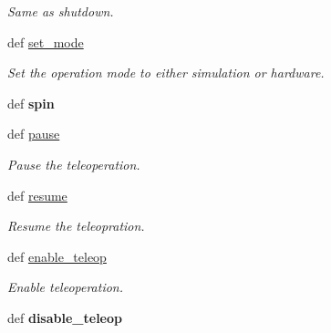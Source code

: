 \begin{DoxyCompactItemize}
\begin{DoxyCompactList}\small\item\em Same as shutdown. \end{DoxyCompactList}\item 
def \hyperlink{classcamera__control__node_1_1Teleop__class_a611b6acc2e845d0269b2194ae1c52457}{set\-\_\-mode}
\begin{DoxyCompactList}\small\item\em Set the operation mode to either simulation or hardware. \end{DoxyCompactList}\item 
\hypertarget{classcamera__control__node_1_1Teleop__class_abbb8d5b8c8dfbc2736fb3e1cb28d54f6}{def {\bfseries spin}}\label{classcamera__control__node_1_1Teleop__class_abbb8d5b8c8dfbc2736fb3e1cb28d54f6}

\item 
\hypertarget{classcamera__control__node_1_1Teleop__class_a4ad0f95701d0951b3f758613f5fdc3c5}{def \hyperlink{classcamera__control__node_1_1Teleop__class_a4ad0f95701d0951b3f758613f5fdc3c5}{pause}}\label{classcamera__control__node_1_1Teleop__class_a4ad0f95701d0951b3f758613f5fdc3c5}

\begin{DoxyCompactList}\small\item\em Pause the teleoperation. \end{DoxyCompactList}\item 
\hypertarget{classcamera__control__node_1_1Teleop__class_a55a643e5dfb067fd86426c9aea1a8ec3}{def \hyperlink{classcamera__control__node_1_1Teleop__class_a55a643e5dfb067fd86426c9aea1a8ec3}{resume}}\label{classcamera__control__node_1_1Teleop__class_a55a643e5dfb067fd86426c9aea1a8ec3}

\begin{DoxyCompactList}\small\item\em Resume the teleopration. \end{DoxyCompactList}\item 
\hypertarget{classcamera__control__node_1_1Teleop__class_a4f6e515dab9822f8513ad23da7be7b36}{def \hyperlink{classcamera__control__node_1_1Teleop__class_a4f6e515dab9822f8513ad23da7be7b36}{enable\-\_\-teleop}}\label{classcamera__control__node_1_1Teleop__class_a4f6e515dab9822f8513ad23da7be7b36}

\begin{DoxyCompactList}\small\item\em Enable teleoperation. \end{DoxyCompactList}\item 
\hypertarget{classcamera__control__node_1_1Teleop__class_a0cd67e1acfe8351955a64b0b64db1e4c}{def {\bfseries disable\-\_\-teleop}}\label{classcamera__control__node_1_1Teleop__class_a0cd67e1acfe8351955a64b0b64db1e4c}


\end{DoxyCompactItemize}
